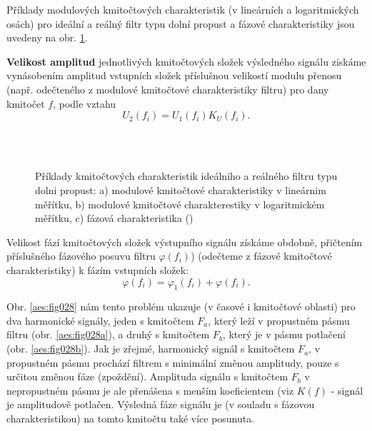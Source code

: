       Příklady modulových kmitočtových charakteristik (v lineárních a logaritmických osách) pro
      ideální a reálný filtr typu dolní propust a fázové charakteristiky jsou uvedeny na obr.
      \ref{aes:fig027}. 
      
      \textbf{Velikost amplitud} jednotlivých kmitočtových složek výsledného signálu ziskáme
      vynásobením amplitud vstupních složek příslušnou velikostí modulu přenosu (např. odečteného
      z modulové kmitočtové charakteristiky filtru) pro dany kmitočet \(f\), podle vztahu
      \begin{equation*}
        U_2(f_i) = U_1(f_i)K_U(f_i).
      \end{equation*} 

      \begin{figure}[ht!]
        \centering  
          \\
          \\
        \caption{Příklady kmitočtových charakteristik ideálniho a reálného filtru typu dolni
                 propust: a) modulové kmitočtové charakteristiky v lineárnim měřítku, b) modulové
                 kmitočtové charakterestiky v logaritmickém měřítku, c) fázová charakteristika
                (\cite[s.~27]{HajekSedlacek2002})}
        \label{aes:fig027}
      \end{figure}

      Velikost fází kmitočtových složek výstupního signálu získáme obdobně, přičtením příslušného
      fázového posuvu filtru \(\varphi(f_i)\)) (odečteme z fázové kmitočtové charakteristiky) k
      fázím vstupních složek:
      \begin{equation*}
        \varphi(f_i) = \varphi_1(f_i) + \varphi(f_i).
      \end{equation*} 

      Obr. \ref{aes:fig028} nám tento problém ukazuje (v časové i kmitočtové oblasti) pro dva
      harmonické signály, jeden s kmitočtem \(F_a\), který leží v propustném pásmu filtru (obr.
      \ref{aes:fig028a}), a druhý s kmitočtem \(F_b\), který je v pásmu potlačení (obr.
      \ref{aes:fig028b}). Jak je zřejmé, harmonický signál s kmitočtem \(F_a\), v propustném
      pásmu prochází filtrem s minimální změnou amplitudy, pouze s určitou změnou fáze (zpoždění).
      Amplituda signálu s kmitočtem \(F_b\) v nepropustném pásmu je ale přenášena s menším
      koeficientem (viz \(K(f)\) - signál je amplitudově potlačen. Výsledná fáze signálu je (v
      souladu s fázovou charakteristikou) na tomto kmitočtu také více posunuta.
      

